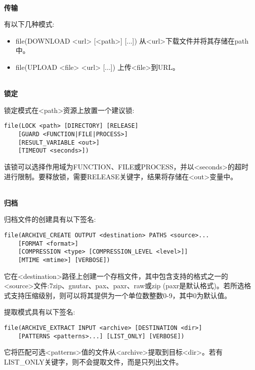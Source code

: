 \hspace*{\fill} \\ %
\noindent
\textbf{传输}

有以下几种模式:

\begin{itemize}
\item 
file(DOWNLOAD <url> [<path>] [...]) 从<url>下载文件并将其存储在path中。

\item 
file(UPLOAD <file> <url> [...]) 上传<file>到URL。
\end{itemize}


\hspace*{\fill} \\ %
\noindent
\textbf{锁定}

锁定模式在<path>资源上放置一个建议锁:

\begin{lstlisting}[style=styleCMake]
file(LOCK <path> [DIRECTORY] [RELEASE]
	[GUARD <FUNCTION|FILE|PROCESS>]
	[RESULT_VARIABLE <out>]
	[TIMEOUT <seconds>])
\end{lstlisting}

该锁可以选择作用域为FUNCTION、FILE或PROCESS，并以<seconds>的超时进行限制。要释放锁，需要RELEASE关键字，结果将存储在<out>变量中。

\hspace*{\fill} \\ %
\noindent
\textbf{归档}

归档文件的创建具有以下签名:

\begin{lstlisting}[style=styleCMake]
file(ARCHIVE_CREATE OUTPUT <destination> PATHS <source>...
	[FORMAT <format>]
	[COMPRESSION <type> [COMPRESSION_LEVEL <level>]]
	[MTIME <mtime>] [VERBOSE])
\end{lstlisting}

它在<destination>路径上创建一个存档文件，其中包含支持的格式之一的<source>文件:7zip、gnutar、pax、paxr、raw或zip (paxr是默认格式)。若所选格式支持压缩级别，则可以将其提供为一个单位数整数0-9，其中0为默认值。

提取模式具有以下签名:

\begin{lstlisting}[style=styleCMake]
file(ARCHIVE_EXTRACT INPUT <archive> [DESTINATION <dir>]
	[PATTERNS <patterns>...] [LIST_ONLY] [VERBOSE])
\end{lstlisting}

它将匹配可选<patterns>值的文件从<archive>提取到目标<dir>。若有LIST\_ONLY关键字，则不会提取文件，而是只列出文件。



